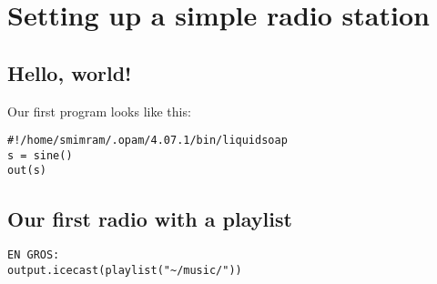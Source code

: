 \chapter{Setting up a simple radio station}
\section{Hello, world!}
Our first program looks like this:
\begin{verbatim}
#!/home/smimram/.opam/4.07.1/bin/liquidsoap
s = sine()
out(s)
\end{verbatim}

\section{Our first radio with a playlist}
\begin{verbatim}
EN GROS:
output.icecast(playlist("~/music/"))
\end{verbatim}
